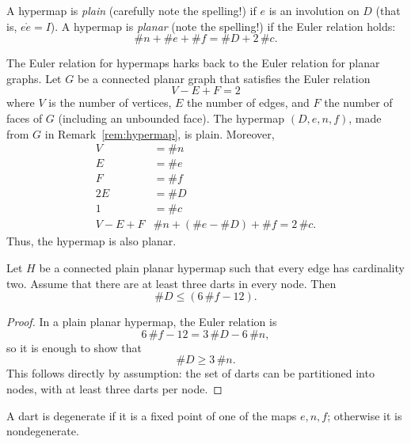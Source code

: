 \begin{definition} A hypermap is {\it plain} (carefully note the spelling!) if
$e$ is an involution on $D$ (that is, $e\ocirc e = I$).  A hypermap
is {\it planar} (note the spelling!) if the Euler relation holds:
    $$\# n + \# e + \# f = \# D + 2\, \#c.$$
\end{definition}


\begin{remark}\label{rem:Euler}  The Euler relation for hypermaps harks back
to the Euler relation for planar graphs.
Let $G$ be a connected planar graph that satisfies the
Euler relation
    $$V - E + F = 2$$
where $V$ is the number of vertices, $E$ the number of edges, and
$F$ the number of faces of $G$ (including an unbounded face). The
hypermap $(D,e,n,f)$, made from $G$ in
Remark~\ref{rem:hypermap}, is plain.
Moreover,
    $$\begin{array}{lll}
    V &= \# n\\
    E &= \# e\\
    F &= \# f\\
    2E &= \# D\\
    1 &= \#c\\
    V - E + F  &\# n + (\#e - \#D) + \# f = 2\,\# c.
    \end{array}
    $$
Thus, the hypermap is also planar.
\end{remark}


\begin{lemma}\label{lemma:dart-upper} 
Let $H$ be a connected plain planar hypermap such that every edge has cardinality two.  Assume that
there are at least three darts in every node.  Then
$$
\# D \le (6\, \#f - 12).
$$
\end{lemma}

\begin{proof}  In a plain planar hypermap, the Euler relation is
$$6\, \#f - 12 = 3\,\#D - 6\,\#n,$$
so it is enough to show that
$$
\# D \ge 3\,\#n.
$$
This follows directly by assumption: the set of darts can be partitioned into nodes, with at least three darts per node.
\end{proof}



\begin{definition}[degenerate] A dart is degenerate if it is a
fixed point of one of the maps $e,n,f$; otherwise it is nondegenerate.  
\end{definition}

